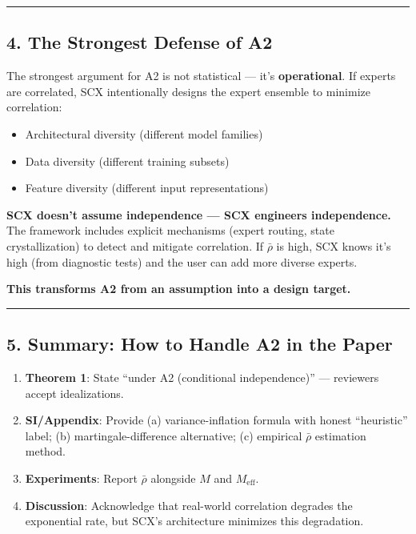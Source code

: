 \documentclass[
  12pt,
]{article}
\begin{document}
\begin{center}\rule{0.5\linewidth}{0.5pt}\end{center}

\subsection{4. The Strongest Defense of A2}\label{strongest-defense-of-a2}

The strongest argument for A2 is not statistical — it's \textbf{operational}. If experts are correlated, SCX intentionally designs the expert ensemble to minimize correlation:

\begin{itemize}
\item Architectural diversity (different model families)
\item Data diversity (different training subsets)
\item Feature diversity (different input representations)
\end{itemize}

\textbf{SCX doesn't assume independence — SCX engineers independence.} The framework includes explicit mechanisms (expert routing, state crystallization) to detect and mitigate correlation. If \(\bar{\rho}\) is high, SCX knows it's high (from diagnostic tests) and the user can add more diverse experts.

\textbf{This transforms A2 from an assumption into a design target.}

\begin{center}\rule{0.5\linewidth}{0.5pt}\end{center}

\subsection{5. Summary: How to Handle A2 in the Paper}\label{summary-how-to-handle-a2}

\begin{enumerate}
\item \textbf{Theorem 1}: State ``under A2 (conditional independence)'' — reviewers accept idealizations.
\item \textbf{SI/Appendix}: Provide (a) variance-inflation formula with honest ``heuristic'' label; (b) martingale-difference alternative; (c) empirical \(\bar{\rho}\) estimation method.
\item \textbf{Experiments}: Report \(\bar{\rho}\) alongside \(M\) and \(M_{\text{eff}}\).
\item \textbf{Discussion}: Acknowledge that real-world correlation degrades the exponential rate, but SCX's architecture minimizes this degradation.
\end{enumerate}
\end{document}
